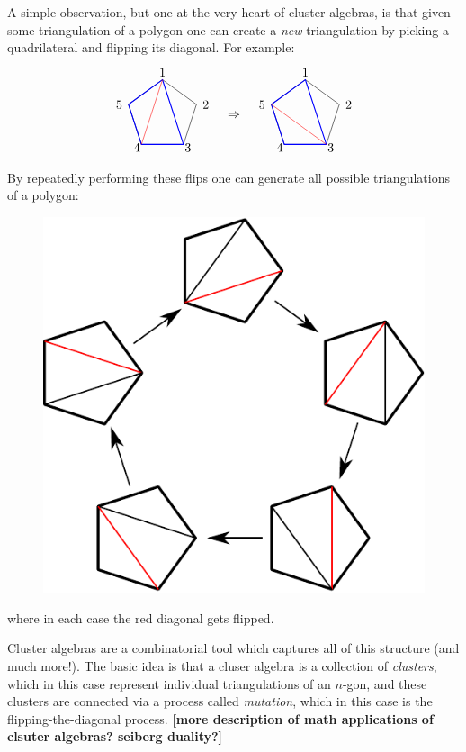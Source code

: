 \documentclass[11pt]{article}
\def\draftnote#1{{\bf [#1]}}
\def\drawLabeledPentagon{
\coordinate (P1) at (90:1);
\coordinate (P2) at (18:1);
\coordinate (P3) at (306:1);
\coordinate (P4) at (234:1);
\coordinate (P5) at (162:1);
\draw (P1) -- (P2) -- (P3) -- (P4) -- (P5) -- cycle;
\draw (0,1.2) node {1};
\draw (1,.3) node[anchor=west] {2};
\draw (.5,-.9) node[anchor=west] {3};
\draw (-.5,-.9) node[anchor=east] {4};
\draw (-1,.3) node[anchor=east] {5};
}
\begin{document}
A simple observation, but one at the very heart of cluster algebras, is that given some triangulation of a polygon one can create a \emph{new} triangulation by picking a quadrilateral and flipping its diagonal. For example:
\begin{equation}
\begin{tikzpicture}
  \drawLabeledPentagon
  \draw[color=blue, thick] (P1) -- (P3) -- (P4) -- (P5) -- cycle;
  \draw[color=red] (P1) -- (P4);
  \draw (2,0) node {$\Rightarrow$};
\begin{scope}[xshift = 4cm]
  \drawLabeledPentagon
  \draw[color=blue, thick] (P1) -- (P3) -- (P4) -- (P5) -- cycle;
  \draw[color=red] (P5) -- (P3);
\end{scope}
\end{tikzpicture} 
\end{equation}
By repeatedly performing these flips one can generate all possible triangulations of a polygon:
\pagebreak
\begin{figure}[h!]
  \centering
  \includegraphics[scale=0.6]{pentagon-triangulations}
\end{figure}

\noindent where in each case the red diagonal gets flipped. 

Cluster algebras are a combinatorial tool which captures all of this structure (and much more!). The basic idea is that a cluser algebra is a collection of \emph{clusters}, which in this case represent individual triangulations of an $n$-gon, and these clusters are connected via a process called \emph{mutation}, which in this case is the flipping-the-diagonal process. \draftnote{more description of math applications of clsuter algebras? seiberg duality?}
\end{document}
